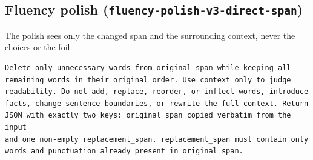 \documentclass[11pt,a4paper]{article}
\begin{document}
\subsection{Fluency polish (\texttt{fluency-polish-v3-direct-span})}

The polish sees only the changed span and the surrounding context, never the choices
or the foil.

\begin{lstlisting}[style=prompt]
Delete only unnecessary words from original_span while keeping all
remaining words in their original order. Use context only to judge
readability. Do not add, replace, reorder, or inflect words, introduce
facts, change sentence boundaries, or rewrite the full context. Return
JSON with exactly two keys: original_span copied verbatim from the input
and one non-empty replacement_span. replacement_span must contain only
words and punctuation already present in original_span.
\end{lstlisting}
\end{document}
